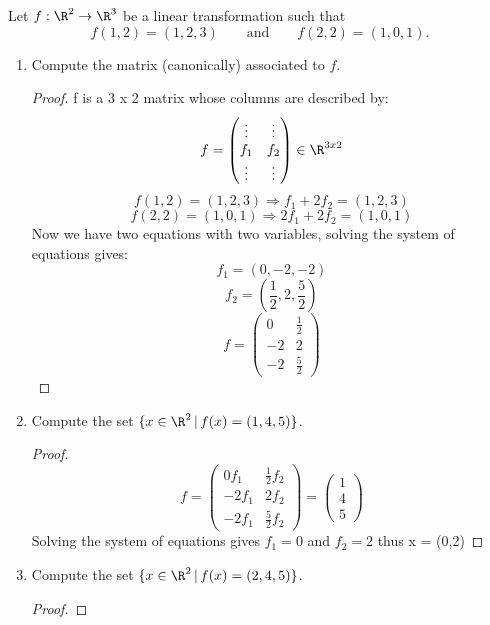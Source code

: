 \documentclass[11pt,nocut]{article}
\begin{document}
\vspace{5mm}

\begin{problem}[3 points]
	Let $f: \R^2 \to \R^3$ be a linear transformation such that
	$$
	f(1,2) = (1,2,3)
	\qquad \text{and} \qquad f(2,2) = (1,0,1).
	$$
	\begin{enumerate}[label=\normalfont(\textbf{\alph*})]
		\item Compute the matrix (canonically) associated to $f$.\\
		\begin{proof}
		f is a 3 x 2 matrix whose columns are described by:
		$$ f = 
			\begin{pmatrix}
			\vdots & \vdots \\
			f_1 & f_2 \\
			\vdots & \vdots
			\end{pmatrix}
		        \in \R^{3x2}
		$$
		$$
		f(1,2) = (1,2,3) \Rightarrow f_1 + 2f_2 = (1,2,3)
		$$
		$$
		f(2,2) = (1,0,1) \Rightarrow 2 f_1 + 2 f_2 = (1,0,1)
		$$
		Now we have two equations with two variables, solving the system of equations gives:
		$$
		f_1 = (0,-2,-2)
		$$
		$$
		f_2 = ( \frac{1}{2} , 2, \frac{5}{2} )
		$$
		$$ f = 
			\begin{pmatrix}
			0 & \frac{1}{2}\\
			-2 & 2\\
			-2 & \frac{5}{2}
			\end{pmatrix}
		$$
		\end{proof}
		\item Compute the set $\{x \in \R^2 \, | \, f(x) = (1,4,5) \}$.\\
		\begin{proof}
		$$ f = 
			\begin{pmatrix}
			0 f_1& \frac{1}{2}f_2\\
			-2 f_1& 2f_2\\
			-2 f_1& \frac{5}{2}f_2
			\end{pmatrix}
		=
			\begin{pmatrix}
			1\\
			4\\
			5
			\end{pmatrix}
		$$
		Solving the system of equations gives $f_1 = 0$ and $f_2 = 2$ thus x = (0,2)
		\end{proof}
		\item Compute the set $\{x \in \R^2 \, | \, f(x) = (2,4,5) \}$.\\
		\begin{proof}

\end{proof}
\end{enumerate}
\end{problem}
\end{document}
